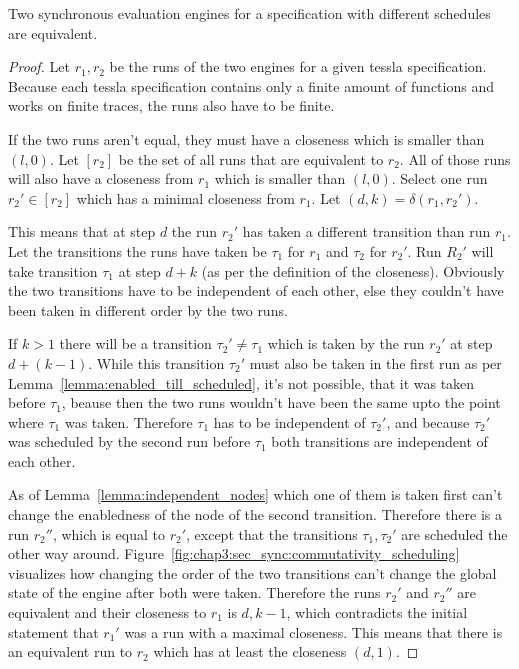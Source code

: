 \begin{theorem}[name = Equivalence of Different Synchronous Evaluation Engines]\label{theorem:equivalence_sync_eval_engines}
  Two synchronous evaluation engines for a specification with different schedules are equivalent.
\end{theorem}
\begin{proof}

  Let \(r_1, r_2\) be the runs of the two engines for a given \gls{tessla} specification.
  Because each \gls{tessla} specification contains only a finite amount of functions and works on finite traces, the runs also have to be finite.

If the two runs aren't equal, they must have a closeness which is smaller than \((l, 0)\).
Let \([r_2]\) be the set of all runs that are equivalent to \(r_2\).
All of those runs will also have a closeness from \(r_1\) which is smaller than \((l, 0)\).
Select one run \(r_2' \in [r_2]\) which has a minimal closeness from \(r_1\).
Let \((d,k) = \delta(r_1, r_2')\).

This means that at step \(d\) the run \(r_2'\) has taken a different transition than run \(r_1\).
Let the transitions the runs have taken be \(\tau_1\) for \(r_1\) and \(\tau_2\) for \(r_2'\).
Run \(R_2'\) will take transition \(\tau_1\) at step \(d+k\) (as per the definition of the closeness).
Obviously the two transitions have to be independent of each other, else they couldn't have been taken in different order by the two runs.

If \(k > 1\) there will be a transition \(\tau_2' \neq \tau_1\) which is taken by the run \(r_2'\) at step \(d+(k-1)\).
While this transition \(\tau_2'\) must also be taken in the first run as per Lemma~\ref{lemma:enabled_till_scheduled}, it's not possible, that it was taken before \(\tau_1\), beause then the two runs wouldn't have been the same upto the point where \(\tau_1\) was taken.
Therefore \(\tau_1\) has to be independent of \(\tau_2'\), and because \(\tau_2'\) was scheduled by the second run before \(\tau_1\) both transitions are independent of each other.

As of Lemma~\ref{lemma:independent_nodes} which one of them is taken first can't change the enabledness of the node of the second transition.
Therefore there is a run \(r_2''\), which is equal to \(r_2'\), except that the transitions \(\tau_1, \tau_2'\) are scheduled the other way around.
Figure~\ref{fig:chap3:sec_sync:commutativity_scheduling} visualizes how changing the order of the two transitions can't change the global state of the engine after both were taken.
Therefore the runs \(r_2'\) and \(r_2''\) are equivalent and their closeness to \(r_1\) is \(d, k-1\), which contradicts the initial statement that \(r_1'\) was a run with a maximal closeness.
This means that there is an equivalent run to \(r_2\) which has at least the closeness \((d, 1)\).


\end{proof}
